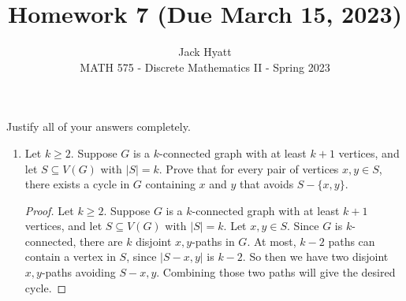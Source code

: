\documentclass[12pt]{article}
\begin{document}
	
	
	
	\title{Homework 7 (Due March 15, 2023)}
	\author{Jack Hyatt\\ %
		MATH 575 - Discrete Mathematics II - Spring 2023} 
	
	\maketitle
	
	Justify all of your answers completely.\\
	
	
	\medskip 
	
	\begin{enumerate}

\item Let $k \geq 2$. Suppose $G$ is a $k$-connected graph with at least $k+1$ vertices, and let $S \subseteq V(G)$ with $|S| = k$. Prove that for every pair of vertices $x,y \in S$, there exists a cycle in $G$ containing $x$ and $y$ that avoids $S - \{x,y\}$.
\begin{proof}
	Let $k \geq 2$. Suppose $G$ is a $k$-connected graph with at least $k+1$ vertices, and let $S \subseteq V(G)$ with $|S| = k$. Let $x,y \in S$. Since $G$ is $k$-connected, there are $k$ disjoint $x,y$-paths in $G$. At most, $k-2$ paths can contain a vertex in $S$, since $|S-{x,y}|$ is $k-2$. So then we have two disjoint $x,y$-paths avoiding $S-{x,y}$. Combining those two paths will give the desired cycle. 
\end{proof}

\medskip 


\end{enumerate}
\end{document}
